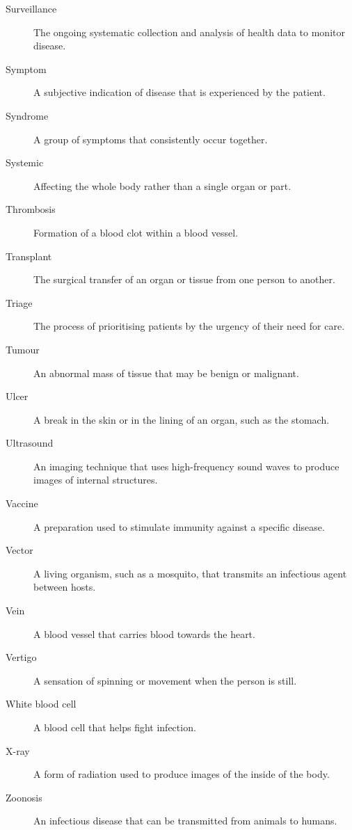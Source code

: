 \documentclass[12pt,oneside]{book}
\begin{document}
\begin{description}
  \item[Surveillance] The ongoing systematic collection and analysis of health data to monitor disease.
  \item[Symptom] A subjective indication of disease that is experienced by the patient.
  \item[Syndrome] A group of symptoms that consistently occur together.
  \item[Systemic] Affecting the whole body rather than a single organ or part.
  \item[Thrombosis] Formation of a blood clot within a blood vessel.
  \item[Transplant] The surgical transfer of an organ or tissue from one person to another.
  \item[Triage] The process of prioritising patients by the urgency of their need for care.
  \item[Tumour] An abnormal mass of tissue that may be benign or malignant.
  \item[Ulcer] A break in the skin or in the lining of an organ, such as the stomach.
  \item[Ultrasound] An imaging technique that uses high-frequency sound waves to produce images of internal structures.
  \item[Vaccine] A preparation used to stimulate immunity against a specific disease.
  \item[Vector] A living organism, such as a mosquito, that transmits an infectious agent between hosts.
  \item[Vein] A blood vessel that carries blood towards the heart.
  \item[Vertigo] A sensation of spinning or movement when the person is still.
  \item[White blood cell] A blood cell that helps fight infection.
  \item[X-ray] A form of radiation used to produce images of the inside of the body.
  \item[Zoonosis] An infectious disease that can be transmitted from animals to humans.
\end{description}



\clearpage
{}
\printindex

\backmatter
\end{document}
